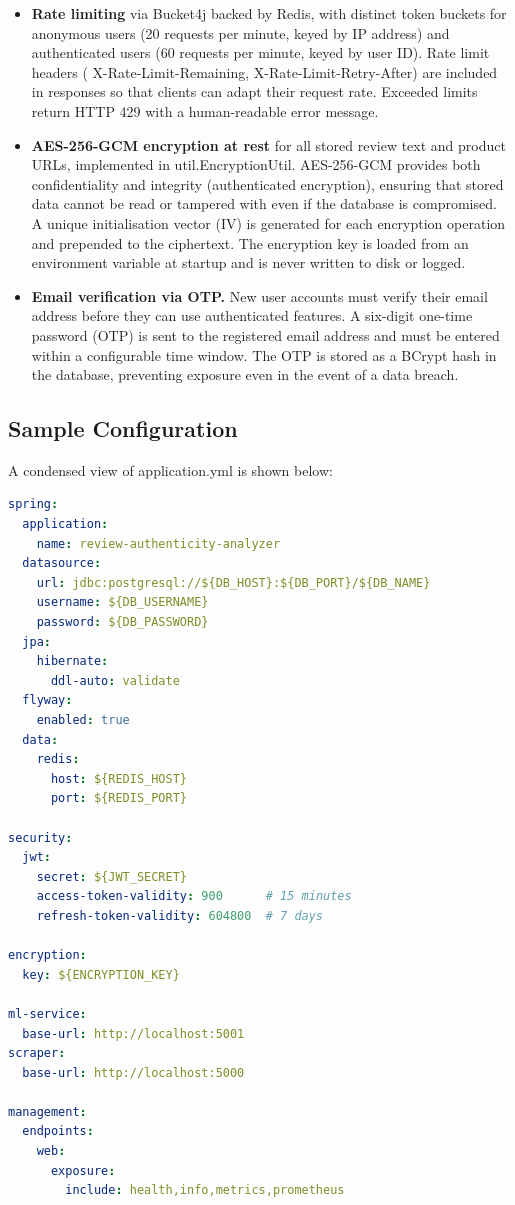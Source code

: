\documentclass[12pt,a4paper,oneside]{report}
\renewcommand{\texttt}[1]{%
  {\ttfamily\hyphenchar\font=45\relax #1}}
\begin{document}
\begin{itemize}[leftmargin=*]
  \item \textbf{Rate limiting} via Bucket4j backed by Redis, with
        distinct token buckets for anonymous users (20 requests per
        minute, keyed by IP address) and authenticated users (60 requests
        per minute, keyed by user ID). Rate limit headers
        (\texttt{X-Rate-Limit-Remaining}, \texttt{X-Rate-Limit-Retry-After})
        are included in responses so that clients can adapt their request
        rate. Exceeded limits return HTTP 429 with a human-readable error
        message.

  \item \textbf{AES-256-GCM encryption at rest} for all stored review
        text and product URLs, implemented in
        \texttt{util.EncryptionUtil}. AES-256-GCM provides both
        confidentiality and integrity (authenticated encryption), ensuring
        that stored data cannot be read or tampered with even if the
        database is compromised. A unique initialisation vector (IV) is
        generated for each encryption operation and prepended to the
        ciphertext. The encryption key is loaded from an environment
        variable at startup and is never written to disk or logged.

  \item \textbf{Email verification via OTP.} New user accounts must
        verify their email address before they can use authenticated
        features. A six-digit one-time password (OTP) is sent to the
        registered email address and must be entered within a configurable
        time window. The OTP is stored as a BCrypt hash in the database,
        preventing exposure even in the event of a data breach.
\end{itemize}

\subsection{Sample Configuration}
A condensed view of \texttt{application.yml} is shown below:

\begin{lstlisting}[language=yaml,caption={Condensed Spring Boot configuration},label={lst:appyml}]
spring:
  application:
    name: review-authenticity-analyzer
  datasource:
    url: jdbc:postgresql://${DB_HOST}:${DB_PORT}/${DB_NAME}
    username: ${DB_USERNAME}
    password: ${DB_PASSWORD}
  jpa:
    hibernate:
      ddl-auto: validate
  flyway:
    enabled: true
  data:
    redis:
      host: ${REDIS_HOST}
      port: ${REDIS_PORT}

security:
  jwt:
    secret: ${JWT_SECRET}
    access-token-validity: 900      # 15 minutes
    refresh-token-validity: 604800  # 7 days

encryption:
  key: ${ENCRYPTION_KEY}

ml-service:
  base-url: http://localhost:5001
scraper:
  base-url: http://localhost:5000

management:
  endpoints:
    web:
      exposure:
        include: health,info,metrics,prometheus
\end{lstlisting}
\end{document}
